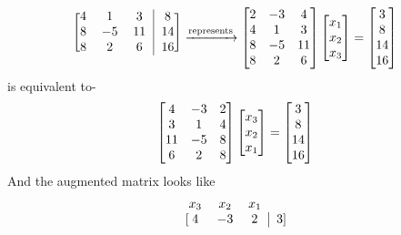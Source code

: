 \documentclass{article}
\begin{document}
\begin{enumerate}
\[\begin{blockarray}{cccc}
\begin{block}{[ccc|c]}
        4 & 1 & 3 & 8 \\
        8 & -5 & 11 & 14\\
        8 & 2 & 6 & 16 \\
        \end{block}
        \end{blockarray}
            \xrightarrow{\text{represents}}
               \begin{bmatrix}
                   2 & -3 & 4\\
                   4 & 1 & 3\\
                   8 & -5 & 11\\
                   8 & 2 & 6
               \end{bmatrix}
                    \begin{bmatrix}
                        x_1\\x_2\\x_3
                    \end{bmatrix} = 
                        \begin{bmatrix}
                            3\\8\\14\\16
                        \end{bmatrix}\\
            \]
    is equivalent to-
    \[       
        \begin{bmatrix}
        4 & -3 & 2\\
        3 & 1 & 4\\
        11 & -5 & 8\\
        6 & 2 & 8
    \end{bmatrix}
        \begin{bmatrix}
            x_3\\x_2\\x_1
        \end{bmatrix} = 
            \begin{bmatrix}
                3\\8\\14\\16
            \end{bmatrix}\\
    \]
    And the augmented matrix looks like
    \[
    \begin{blockarray}{cccc}
        x_3 & x_2 & x_1 && \\
        \begin{block}{[ccc|c]}
        4 & -3 & 2 & 3 \\

\end{block}
\end{blockarray}\]
\end{enumerate}
\end{document}
